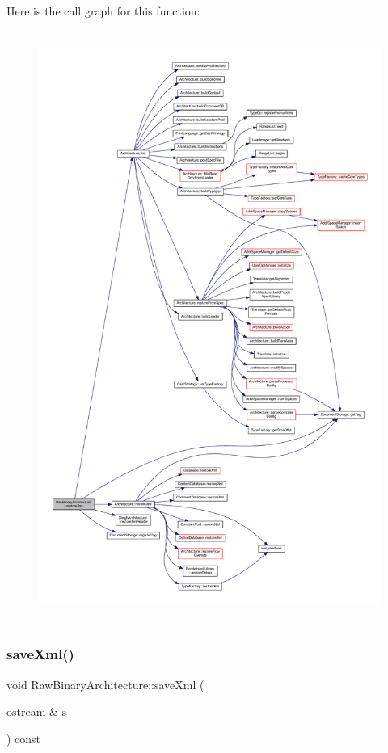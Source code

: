 Here is the call graph for this function\+:
\nopagebreak
\begin{figure}[H]
\begin{center}
\leavevmode
\includegraphics[height=550pt]{class_raw_binary_architecture_a381c8c1c048d0c8a17322ef8a17ae6ea_cgraph}
\end{center}
\end{figure}
\mbox{\label{class_raw_binary_architecture_a3aafb658662f5d6af564e22f5b35aafc}} 
\subsubsection{\texorpdfstring{saveXml()}{saveXml()}}
{\footnotesize\ttfamily void Raw\+Binary\+Architecture\+::save\+Xml (\begin{DoxyParamCaption}\item[{ostream \&}]{s }\end{DoxyParamCaption}) const\hspace{0.3cm}{\ttfamily [virtual]}}



